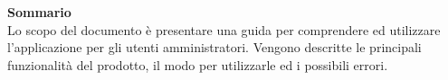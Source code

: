 \Large{\textbf{Sommario}}\\
{
\normalsize
Lo scopo del documento è presentare una guida per comprendere ed utilizzare l'applicazione \textbf{\mytalk} per gli utenti amministratori. Vengono descritte le principali funzionalità del prodotto, il modo per utilizzarle ed i possibili errori. 
}

